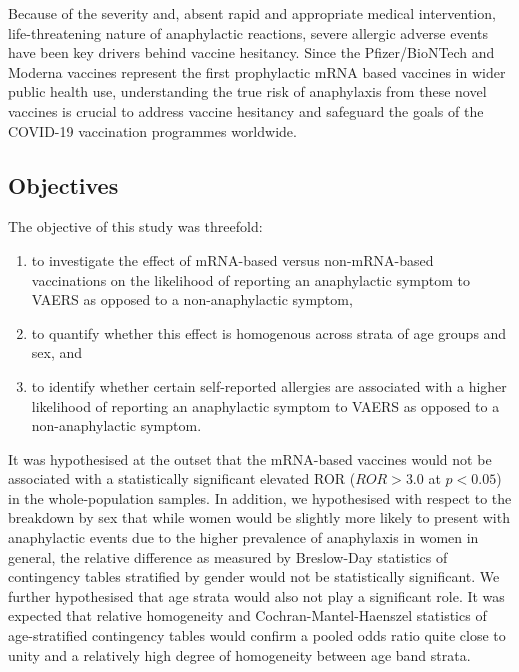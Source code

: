 \documentclass{article}
\begin{document}
Because of the severity and, absent rapid and appropriate medical intervention, life-threatening nature of anaphylactic reactions, severe allergic adverse events have been key drivers behind vaccine hesitancy.\cite{tulloch2021covid,marcec2021postvaccination,jacobson2015vaccine}
Since the Pfizer/BioNTech and Moderna vaccines represent the first prophylactic mRNA based vaccines in wider public health use, understanding the true risk of anaphylaxis from these novel vaccines is crucial to address vaccine hesitancy and safeguard the goals of the COVID-19 vaccination programmes worldwide.

\subsection{Objectives}\label{subsec:objectives}

The objective of this study was threefold:

\begin{enumerate}
    \item to investigate the effect of mRNA-based versus non-mRNA-based vaccinations on the likelihood of reporting an anaphylactic symptom to VAERS as opposed to a non-anaphylactic symptom,
    \item to quantify whether this effect is homogenous across strata of age groups and sex, and
    \item to identify whether certain self-reported allergies are associated with a higher likelihood of reporting an anaphylactic symptom to VAERS as opposed to a non-anaphylactic symptom.
\end{enumerate}

It was hypothesised at the outset that the mRNA-based vaccines would not be associated with a statistically significant elevated ROR ($ROR > 3.0$ at $p < 0.05$) in the whole-population samples.
In addition, we hypothesised with respect to the breakdown by sex that while women would be slightly more likely to present with anaphylactic events due to the higher prevalence of anaphylaxis in women in general,\cite{salvati2019gender} the relative difference as measured by Breslow-Day statistics of contingency tables stratified by gender would not be statistically significant.
We further hypothesised that age strata would also not play a significant role.
It was expected that relative homogeneity and Cochran-Mantel-Haenszel statistics of age-stratified contingency tables would confirm a pooled odds ratio quite close to unity and a relatively high degree of homogeneity between age band strata.
\end{document}
